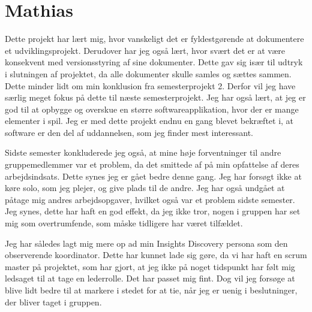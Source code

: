 \section{Mathias}
Dette projekt har lært mig, hvor vanskeligt det er fyldestgørende at dokumentere et udviklingsprojekt. Derudover har jeg også lært, hvor svært det er at være konsekvent med versionsstyring af sine dokumenter. Dette gav sig især til udtryk i slutningen af projektet, da alle dokumenter skulle samles og sættes sammen. Dette minder lidt om min konklusion fra semesterprojekt 2. Derfor vil jeg have særlig meget fokus på dette til næste semesterprojekt. Jeg har også lært, at jeg er god til at opbygge og overskue en større softwareapplikation, hvor der er mange elementer i spil. Jeg er med dette projekt endnu en gang blevet bekræftet i, at software er den del af uddannelsen, som jeg finder mest interessant.
 
Sidste semester konkluderede jeg også, at mine høje forventninger til andre gruppemedlemmer var et problem, da det smittede af på min opfattelse af deres arbejdsindsats. Dette synes jeg er gået bedre denne gang. Jeg har forsøgt ikke at køre solo, som jeg plejer, og give plads til de andre. Jeg har også undgået at påtage mig andres arbejdsopgaver, hvilket også var et problem sidste semester. Jeg synes, dette har haft en god effekt, da jeg ikke tror, nogen i gruppen har set mig som overtrumfende, som måske tidligere har været tilfældet. 

Jeg har således lagt mig mere op ad min Insights Discovery persona som den observerende koordinator. Dette har kunnet lade sig gøre, da vi har haft en scrum master på projektet, som har gjort, at jeg ikke på noget tidspunkt har følt mig ledsaget til at tage en lederrolle. Det har passet mig fint. Dog vil jeg forsøge at blive lidt bedre til at markere i stedet for at tie, når jeg er uenig i beslutninger, der bliver taget i gruppen. 
\clearpage
